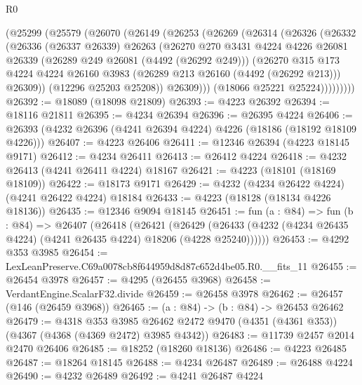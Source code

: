 \begin{lexlean}{R0}
\begin{coremodule}
        (@25299
          (@25579
            (@26070
              (@26149
                (@26253
                  (@26269
                    (@26314
                      (@26326
                        (@26332
                          (@26336
                            (@26337 @26339)
                            @26263
                            (@26270
                              @270
                              @3431
                              @4224
                              @4226
                              @26081
                              @26339
                              (@26289 @249 @26081 (@4492 (@26292 @249)))
                              (@26270
                                @315
                                @173
                                @4224
                                @4224
                                @26160
                                @3983
                                (@26289 @213 @26160 (@4492 (@26292 @213)))
                                @26309))
                            (@12296 @25203 @25208))
                          @26309)))
                    (@18066 @25221 @25224)))))))))
@26392 := @18089 (@18098 @21809)
@26393 := @4223 @26392
@26394 := @18116 @21811
@26395 := @4234 @26394
@26396 := @26395 @4224
@26406 := @26393 (@4232 @26396 (@4241 @26394 @4224) @4226 (@18186 (@18192 @18109 @4226)))
@26407 := @4223 @26406
@26411 := @12346 @26394 (@4223 @18145 @9171)
@26412 := @4234 @26411
@26413 := @26412 @4224
@26418 := @4232 @26413 (@4241 @26411 @4224) @18167
@26421 := @4223 (@18101 (@18169 @18109))
@26422 := @18173 @9171
@26429 := @4232 (@4234 @26422 @4224) (@4241 @26422 @4224) @18184
@26433 := @4223 (@18128 (@18134 @4226 @18136))
@26435 := @12346 @9094 @18145
@26451 := fun (a : @84) =>
  fun (b : @84) =>
  @26407
    (@26418
      (@26421
        (@26429 (@26433 (@4232 (@4234 @26435 @4224) (@4241 @26435 @4224) @18206 (@4228 @25240))))))
@26453 := @4292 @353 @3985
@26454 := LexLeanPreserve.C69a0078cb8f644959d8d87c652d4be05.R0.__fits_11
@26455 := @26454 @3978
@26457 := @4295 (@26455 @3968)
@26458 := VerdantEngine.ScalarF32.divide
@26459 := @26458 @3978
@26462 := @26457 (@146 (@26459 @3968))
@26465 := (a : @84) -> (b : @84) -> @26453 @26462
@26479 := @4318
    @353
    @3985
    @26462
    @2472
    @9470
    (@4351 (@4361 @353))
    (@4367 (@4368 (@4369 @2472) @3985 @4342))
@26483 := @11739 @2457 @2014 @2470 @26406
@26485 := @18252 (@18260 @18136)
@26486 := @4223 @26485
@26487 := @18264 @18145
@26488 := @4234 @26487
@26489 := @26488 @4224
@26490 := @4232 @26489
@26492 := @4241 @26487 @4224

\end{coremodule}
\end{lexlean}
